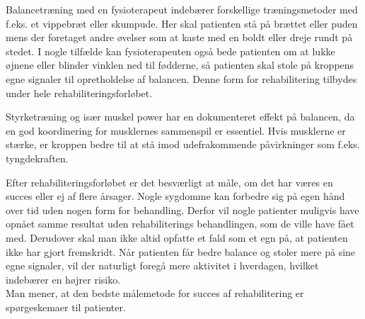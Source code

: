Balancetræning med en fysioterapeut indebærer forskellige træningsmetoder med f.eks. et vippebræt eller skumpude. Her skal patienten stå på brættet eller puden mens der foretaget andre øvelser som at kaste med en boldt eller dreje rundt på stedet. I nogle tilfælde kan fysioterapeuten også bede patienten om at lukke øjnene eller blinder vinklen ned til fødderne, så patienten skal stole på kroppens egne signaler til opretholdelse af balancen. \cite{Joergensen2004} Denne form for rehabilitering tilbydes under hele rehabiliteringsforløbet. \cite{Sundhedsstyrelsen2011a}

Styrketræning og især muskel power har en dokumenteret effekt på balancen, da en god koordinering for musklernes sammenspil er essentiel. Hvis musklerne er stærke, er kroppen bedre til at stå imod udefrakommende påvirkninger som f.eks. tyngdekraften. \cite{Joergensen2004}

Efter rehabiliteringsforløbet er det besværligt at måle, om det har væres en succes eller ej af flere årsager. Nogle sygdomme kan forbedre sig på egen hånd over tid uden nogen form for behandling. Derfor vil nogle patienter muligvis have opnået samme resultat uden rehabiliterings behandlingen, som de ville have fået med. Derudover skal man ikke altid opfatte et fald som et egn på, at patienten ikke har gjort fremskridt. Når patienten får bedre balance og stoler mere på sine egne signaler, vil der naturligt foregå mere aktivitet i hverdagen, hvilket indebærer en højrer risiko. \\
Man mener, at den bedste målemetode for succes af rehabilitering er spørgeskemaer til patienter. 
